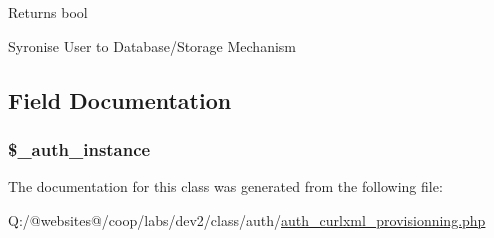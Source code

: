 \begin{DoxyReturn}{Returns}
bool 
\end{DoxyReturn}
Syronise User to Database/\-Storage Mechanism

\subsection{Field Documentation}
\hypertarget{class_xortify_auth_curlxml_provisionning_a486ed878bb5a7188c99ac4c9ee46ac6e}{
\subsubsection[{\$\-\_\-auth\-\_\-instance}]{\setlength{\rightskip}{0pt plus 5cm}\$\-\_\-auth\-\_\-instance}}\label{class_xortify_auth_curlxml_provisionning_a486ed878bb5a7188c99ac4c9ee46ac6e}


The documentation for this class was generated from the following file\-:\begin{DoxyCompactItemize}
\item 
Q\-:/@websites@/coop/labs/dev2/class/auth/\hyperlink{auth__curlxml__provisionning_8php}{auth\-\_\-curlxml\-\_\-provisionning.\-php}\end{DoxyCompactItemize}
